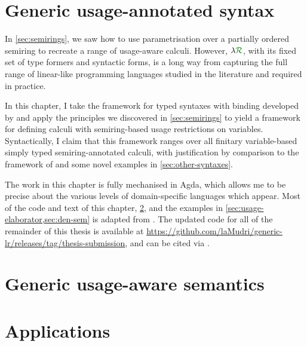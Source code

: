 \chapter{Generic usage-annotated syntax}\label{sec:framework}

In \cref{sec:semirings}, we saw how to use parametrisation over a partially
ordered semiring to recreate a range of usage-aware calculi.
However, $\name$, with its fixed set of type formers and syntactic forms, is a
long way from capturing the full range of linear-like programming languages
studied in the literature and required in practice.

In this chapter, I take the framework for typed syntaxes with binding developed
by \citet{AACMM21} and apply the principles we discovered in
\cref{sec:semirings} to yield a framework for defining calculi with
semiring-based usage restrictions on variables.
Syntactically, I claim that this framework ranges over all finitary
variable-based simply typed semiring-annotated calculi, with justification by
comparison to the framework of \citet{AACMM21} and some novel examples in
\cref{sec:other-syntaxes}.

The work in this chapter is fully mechanised in Agda, which allows me to be
precise about the various levels of domain-specific languages which appear.
Most of the code and text of this chapter, \cref{sec:semantics}, and the
examples in \cref{sec:usage-elaborator,sec:den-sem} is adapted from
\citet{WA22}.
The updated code for all of the remainder of this thesis is available at
\url{https://github.com/laMudri/generic-lr/releases/tag/thesis-submission}, and
can be cited via .



\chapter{Generic usage-aware semantics}\label{sec:semantics}



\chapter{Applications}\label{sec:example-semantics}


